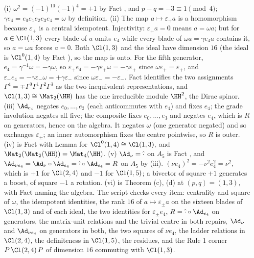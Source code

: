 (i) $\omega^2 = (-1)^{10}(-1)^4 = +1$ by Fact , and $p - q = -3 \equiv 1 \pmod 4$; $\gamma e_4 = e_0e_1e_2e_3e_4 = \omega$ by definition. (ii) The map $a \mapsto \varepsilon_+ a$ is a homomorphism because $\varepsilon_+$ is a central idempotent. Injectivity: $\varepsilon_+ a = 0$ means $a = \omega a$; but for $a \in \Cl(1,3)$ every blade of $a$ omits $e_4$ while every blade of $\omega a = \gamma e_4 a$ contains it, so $a = \omega a$ forces $a = 0$. Both $\Cl(1,3)$ and the ideal have dimension $16$ (the ideal is $\Cl^0(1,4)$ by Fact ), so the map is onto. For the fifth generator, $e_4 = \gamma^{-1}\omega = -\gamma\omega$, so $\varepsilon_+ e_4 = -\gamma\varepsilon_+\omega = -\gamma\varepsilon_+$ since $\omega\varepsilon_+ = \varepsilon_+$, and $\varepsilon_- e_4 = -\gamma\varepsilon_-\omega = +\gamma\varepsilon_-$ since $\omega\varepsilon_- = -\varepsilon_-$. Fact  identifies the two assignments $\Gamma^4 = \mp\Gamma^0\Gamma^1\Gamma^2\Gamma^3$ as the two inequivalent representations, and $\Cl(1,3) \cong \Mat_2(\HH)$ has the one irreducible module $\HH^2$, the Dirac spinor. (iii) $\Ad_{e_4}$ negates $e_0, \ldots, e_3$ (each anticommutes with $e_4$) and fixes $e_4$; the grade involution negates all five; the composite fixes $e_0, \ldots, e_3$ and negates $e_4$, which is $R$ on generators, hence on the algebra. It negates $\omega$ (one generator negated) and so exchanges $\varepsilon_\pm$; an inner automorphism fixes the centre pointwise, so $R$ is outer. (iv) is Fact  with Lemma  for $\Cl^0(1,4) \cong \Cl(1,3)$, and $\Mat_2(\Mat_2(\HH)) = \Mat_4(\HH)$. (v) $\Ad_\nu = \hat{\cdot}$ on $A_5$ is Fact , and $\Ad_{\nu e_4} = \Ad_\nu \circ \Ad_{e_4} = \hat{\cdot} \circ \Ad_{e_4} = R$ on $A_5$ by (iii). $(\nu e_4)^2 = -\nu^2 e_4^2 = \nu^2$, which is $+1$ for $\Cl(2,4)$ and $-1$ for $\Cl(1,5)$; a bivector of square $+1$ generates a boost, of square $-1$ a rotation. (vi) is Theorem (c), (d) at $(p,q) = (1,3)$, with Fact  naming the algebra. The script checks every item: centrality and square of $\omega$, the idempotent identities, the rank $16$ of $a \mapsto \varepsilon_\pm a$ on the sixteen blades of $\Cl(1,3)$ and of each ideal, the two identities for $\varepsilon_\pm e_4$, $R = \hat{\cdot} \circ \Ad_{e_4}$ on generators, the matrix-unit relations and the trivial centre in both repairs, $\Ad_\nu$ and $\Ad_{\nu e_4}$ on generators in both, the two squares of $\nu e_4$, the ladder relations in $\Cl(2,4)$, the definiteness in $\Cl(1,5)$, the residues, and the Rule 1 corner $P\,\Cl(2,4)\,P$ of dimension $16$ commuting with $\Cl(1,3)$.
